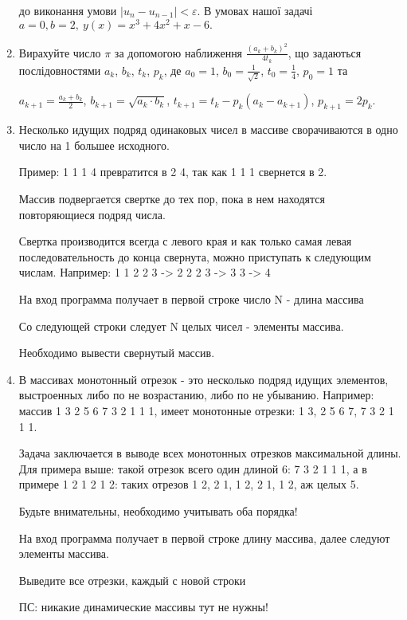 \documentclass[]{article}
\begin{document}
\begin{enumerate}
до виконання умови \(\left| u_{n} - u_{n - 1} \right| < \varepsilon\). В
умовах нашої задачі \(a = 0,b = 2,\ y(x) = x^{3} + 4x^{2} + x - 6.\)


\item
Вирахуйте число $\pi$ за допомогою наближення $\frac{(a_{k} + b_{k})^{2}}{4t_{k}}$,
що задаються послідовностями $a_k$, $b_k$, $t_k$, $p_k$, де
$a_0 = 1$, $b_0 = \frac{1}{\sqrt{2}}$, $t_0 = \frac{1}{4}$, $p_0 = 1$ та

$a_{k+1} = \frac{a_{k} + b_{k}}{2}$, $b_{k+1} = \sqrt{a_{k}\cdot b_{k}}$, 
$t_{k+1} = t_{k} - p_{k}(a_{k}-a_{k+1})$, $p_{k+1} =2p_{k}$.

\item

Несколько идущих подряд одинаковых чисел в массиве сворачиваются в одно число на 1 большее исходного.

Пример: 1 1 1 4 превратится в 2 4, так как 1 1 1 свернется в 2. 

Массив подвергается свертке до тех пор, пока в нем находятся повторяющиеся подряд числа.

Свертка производится всегда с левого края и как только самая левая последовательность до конца свернута, можно приступать к следующим числам. Например: 1 1 2 2 3 -> 2 2 2 3 -> 3 3 -> 4

На вход программа получает в первой строке число N - длина массива

Со следующей строки следует  N целых чисел - элементы массива.

Необходимо вывести свернутый массив.

\item
В массивах монотонный отрезок - это несколько подряд идущих элементов, выстроенных либо по не возрастанию, либо по не убыванию. Например: массив 1 3 2 5 6 7 3 2 1 1 1, имеет монотонные отрезки: 1 3, 2 5 6 7, 7 3 2 1 1 1.

Задача заключается в выводе всех монотонных отрезков максимальной длины. Для примера выше: такой отрезок всего один длиной 6: 7 3 2 1 1 1, а в примере 1 2 1 2 1 2: таких отрезов 1 2, 2 1, 1 2,  2 1, 1 2, аж целых 5.

Будьте внимательны, необходимо учитывать оба порядка!

На вход программа получает в первой строке длину массива, далее следуют элементы массива.

Выведите все отрезки, каждый с новой строки

ПС: никакие динамические массивы тут не нужны!


\end{enumerate}
\end{document}
